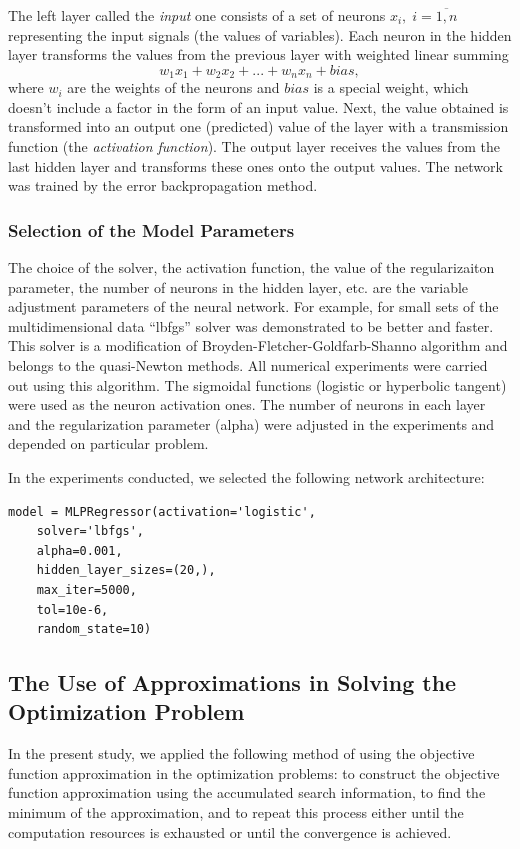 \documentclass[sensors,article,submit,moreauthors,pdftex]{Definitions/mdpi}
\begin{document}
The left layer called the \textit{input} one consists of a set of neurons $x_i, \; i=\overline{1,n}$ representing the input signals (the values of variables). Each neuron in the hidden layer transforms the values from the previous layer with weighted linear summing 
\[
w_1 x_1 + w_2 x_2+...+w_n x_n+bias,
\]
where $w_i$ are the weights of the neurons and $bias$ is a special weight, which doesn't include a factor in the form of an input value. Next, the value obtained is transformed into an output one (predicted) value of the layer with a transmission function (the \textit{activation function}). The output layer receives the values from the last hidden layer and transforms these ones onto the output values. The network was trained by the error backpropagation method.

\subsubsection{Selection of the Model Parameters}

The choice of the solver, the activation function, the value of the regularizaiton parameter, the number of neurons in the hidden layer, etc. are the variable adjustment parameters of the neural network.
For example, for small sets of the multidimensional data ``lbfgs'' solver was demonstrated to be better and faster. This solver is a modification of Broyden-Fletcher-Goldfarb-Shanno algorithm \cite{Nocedal2006} and belongs to the quasi-Newton methods. All numerical experiments were carried out using this algorithm.
The sigmoidal functions (logistic or hyperbolic tangent) were used as the neuron activation ones.
The number of neurons in each layer and the regularization parameter (alpha) were adjusted in the experiments and depended on particular problem.

In the experiments conducted, we selected the following network architecture:
\begin{verbatim}
model = MLPRegressor(activation='logistic',
	solver='lbfgs',
	alpha=0.001,
	hidden_layer_sizes=(20,),
	max_iter=5000,
	tol=10e-6,
	random_state=10)
\end{verbatim}


\subsection{The Use of Approximations in Solving the Optimization Problem}\label{GSA_Appr}

In the present study, we applied the following method of using the objective function approximation in the optimization problems: to construct the objective function approximation using the accumulated search information, to find the minimum of the approximation, and to repeat this process either until the computation resources is exhausted or until the convergence is achieved.
\end{document}
